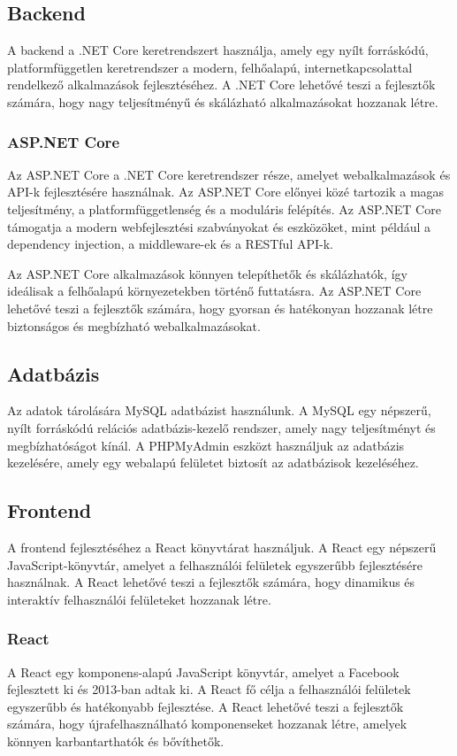 \documentclass[colorlinks]{thesis-kando}
\theoremstyle{definition}
\theoremstyle{remark}
\begin{document}
\subsection{Backend}
A backend a .NET Core keretrendszert használja, amely egy nyílt forráskódú, platformfüggetlen keretrendszer a modern, felhőalapú, internetkapcsolattal rendelkező alkalmazások fejlesztéséhez. A .NET Core lehetővé teszi a fejlesztők számára, hogy nagy teljesítményű és skálázható alkalmazásokat hozzanak létre.

\subsubsection{ASP.NET Core}
Az ASP.NET Core a .NET Core keretrendszer része, amelyet webalkalmazások és API-k fejlesztésére használnak. Az ASP.NET Core előnyei közé tartozik a magas teljesítmény, a platformfüggetlenség és a moduláris felépítés. Az ASP.NET Core támogatja a modern webfejlesztési szabványokat és eszközöket, mint például a dependency injection, a middleware-ek és a RESTful API-k.

Az ASP.NET Core alkalmazások könnyen telepíthetők és skálázhatók, így ideálisak a felhőalapú környezetekben történő futtatásra. Az ASP.NET Core lehetővé teszi a fejlesztők számára, hogy gyorsan és hatékonyan hozzanak létre biztonságos és megbízható webalkalmazásokat.

\subsection{Adatbázis}
Az adatok tárolására MySQL adatbázist használunk. A MySQL egy népszerű, nyílt forráskódú relációs adatbázis-kezelő rendszer, amely nagy teljesítményt és megbízhatóságot kínál. A PHPMyAdmin eszközt használjuk az adatbázis kezelésére, amely egy webalapú felületet biztosít az adatbázisok kezeléséhez.

\subsection{Frontend}
A frontend fejlesztéséhez a React könyvtárat használjuk. A React egy népszerű JavaScript-könyvtár, amelyet a felhasználói felületek egyszerűbb fejlesztésére használnak. A React lehetővé teszi a fejlesztők számára, hogy dinamikus és interaktív felhasználói felületeket hozzanak létre.

\subsubsection{React}
A React egy komponens-alapú JavaScript könyvtár, amelyet a Facebook fejlesztett ki és 2013-ban adtak ki. A React fő célja a felhasználói felületek egyszerűbb és hatékonyabb fejlesztése. A React lehetővé teszi a fejlesztők számára, hogy újrafelhasználható komponenseket hozzanak létre, amelyek könnyen karbantarthatók és bővíthetők.
\end{document}
